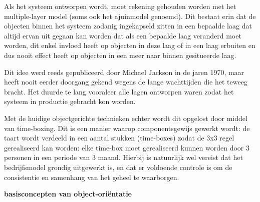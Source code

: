 Als het systeem ontworpen wordt, moet rekening gehouden worden met het multiple-layer model (soms ook het ajuinmodel genoemd). Dit bestaat erin dat de objecten binnen het systeem zodanig ingekapseld zitten in een bepaalde laag dat altijd ervan uit gegaan kan worden dat als een bepaalde laag veranderd moet worden, dit enkel invloed heeft op objecten in deze laag of in een laag erbuiten en dus nooit effect heeft op objecten in een meer naar binnen gesitueerde laag.

Dit idee werd reeds gepubliceerd door Michael Jackson in de jaren 1970, maar heeft nooit eerder doorgang gekend wegens de lange wachttijden die het teweeg bracht. Het duurde te lang vooraleer alle lagen ontworpen waren zodat het systeem in productie gebracht kon worden.

Met de huidige objectgerichte technieken echter wordt dit opgelost door middel van time-boxing. Dit is een manier waarop componentsgewijs gewerkt wordt: de taart wordt verdeeld in een aantal stukken (time-boxes) zodat de 3x3 regel gerealiseerd kan worden: elke time-box moet gerealiseerd kunnen worden door 3 personen in een periode van 3 maand. Hierbij is natuurlijk wel vereist dat het bedrijfsmodel grondig uitgewerkt is, en dat er voldoende controle is om de consistentie en samenhang van het geheel te waarborgen.

\textbf{basisconcepten van object-oriëntatie}

